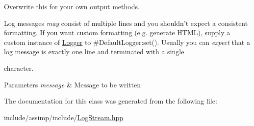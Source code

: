Overwrite this for your own output methods. 

Log messages {\itshape may} consist of multiple lines and you shouldn't expect a consistent formatting. If you want custom formatting (e.\-g. generate H\-T\-M\-L), supply a custom instance of \hyperlink{class_assimp_1_1_logger}{Logger} to \#\-Default\-Logger\-:set(). Usually you can {\itshape expect} that a log message is exactly one line and terminated with a single \par
 character. 
\begin{DoxyParams}{Parameters}
{\em message} & Message to be written \\
\hline
\end{DoxyParams}


The documentation for this class was generated from the following file\-:\begin{DoxyCompactItemize}
\item 
include/assimp/include/\hyperlink{_log_stream_8hpp}{Log\-Stream.\-hpp}\end{DoxyCompactItemize}
